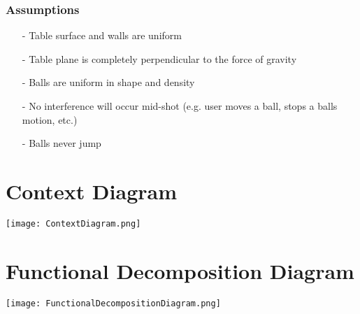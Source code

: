 \documentclass[titlepage]{article}
\begin{document}
\subsubsection{Assumptions}
\begin{itemize}
	\item[-] Table surface and walls are uniform
	\item[-] Table plane is completely perpendicular to the force of gravity
	\item[-] Balls are uniform in shape and density
	\item[-] No interference will occur mid-shot (e.g. user moves a ball, stops a balls motion, etc.)
	\item[-] Balls never jump
\end{itemize}


\section{Context Diagram}
\begin{center}
	\texttt{[image: ContextDiagram.png]}
\label{fig:context diagram}
\end{center}


\section{Functional Decomposition Diagram}
\begin{center}
	\texttt{[image: FunctionalDecompositionDiagram.png]}
\label{fig:functional decomposition diagram}
\end{center}
\newpage
\end{document}

